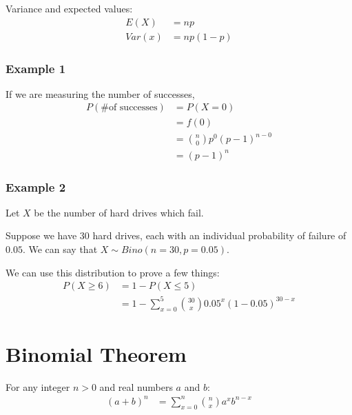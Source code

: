                 Variance and expected values:
                \begin{align*}
                    E(X) &= np \\
                    Var(x) &= np(1 - p)
                \end{align*}
                \subsubsection{Example 1} %
                \label{ssub:example_1}
                    If we are measuring the number of successes,
                    \begin{align*}
                        P(\text{\# of successes}) &= P(X = 0) \\
                        &= f(0) \\
                        &= { n \choose 0} p^0 (p - 1)^{n-0} \\
                        &= (p - 1)^n
                    \end{align*}
                \subsubsection{Example 2} %
                \label{ssub:example_2}
                    Let $X$ be the number of hard drives which fail.

                    Suppose we have $30$ hard drives, each with an individual probability of failure of $0.05$.
                    We can say that $X \sim Bino(n=30, p=0.05)$.

                    We can use this distribution to prove a few things:
                    \begin{align*}
                        P(X\ge 6) &= 1 - P(X \le 5) \\
                                  &= 1 - \sum_{x=0}^5 {30 \choose x} 0.05^x (1 - 0.05)^{30 - x}
                    \end{align*}
            \section{Binomial Theorem} %
            \label{sec:binomial_theorem}
                For any integer $n > 0$ and real numbers $a$ and $b$:
                \begin{align*}
                    (a + b)^n &= \sum_{x = 0}^{n} {n \choose x} a^x b^{n-x}
                \end{align*}
